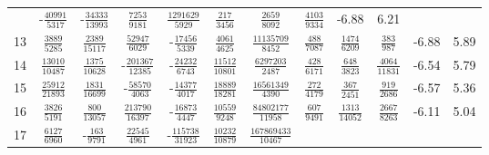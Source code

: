 \documentclass[letterpaper,11pt,nointlimits,reqno,draft]{amsbook}
\begin{document}
\begin{table}
\begin{tabular}{r|ccccccccc|c@{ -- }c@{\%}}
& -$\frac{           40991}{            5317}$
& -$\frac{           34333}{           13993}$
&  $\frac{            7253}{            9181}$
&  $\frac{         1291629}{            5929}$
&  $\frac{             217}{            3456}$
&  $\frac{            2659}{            8092}$
&  $\frac{            4103}{            9334}$
&  -6.88 &  6.21
\\
13
&  $\frac{            3889}{            5285}$
&  $\frac{            2389}{           15117}$
&  $\frac{           52947}{            6029}$
& -$\frac{           17456}{            5339}$
&  $\frac{            4061}{            4625}$
&  $\frac{        11135709}{            8452}$
&  $\frac{             488}{            7087}$
&  $\frac{            1474}{            6209}$
&  $\frac{             383}{             987}$
&  -6.88 &  5.89
\\
14
&  $\frac{           13010}{           10487}$
&  $\frac{            1375}{           10628}$
& -$\frac{          201367}{           12385}$
& -$\frac{           24232}{            6743}$
&  $\frac{           11512}{           10801}$
&  $\frac{         6297203}{            2487}$
&  $\frac{             428}{            6171}$
&  $\frac{             648}{            3823}$
&  $\frac{            4064}{           11831}$
&  -6.54 &  5.79
\\
15
&  $\frac{           25912}{           21893}$
&  $\frac{            1831}{           16699}$
& -$\frac{           58570}{            4063}$
& -$\frac{           14377}{            4017}$
&  $\frac{           18889}{           18281}$
&  $\frac{        16561349}{            4390}$
&  $\frac{             272}{            4179}$
&  $\frac{             367}{            2451}$
&  $\frac{             919}{            2686}$
&  -6.57 &  5.36
\\
16
&  $\frac{            3826}{            5191}$
&  $\frac{             800}{           13057}$
&  $\frac{          213790}{           16397}$
& -$\frac{           16873}{            4447}$
&  $\frac{           10559}{            9248}$
&  $\frac{        84802177}{           11958}$
&  $\frac{             607}{            9491}$
&  $\frac{            1313}{           14052}$
&  $\frac{            2667}{            8263}$
&  -6.11 &  5.04
\\
17
&  $\frac{            6127}{            6960}$
& -$\frac{             163}{            9791}$
&  $\frac{           22545}{            4961}$
& -$\frac{          115738}{           31923}$
&  $\frac{           10232}{           10879}$
&  $\frac{       167869433}{           10467}$

\end{tabular}
\end{table}
\end{document}
